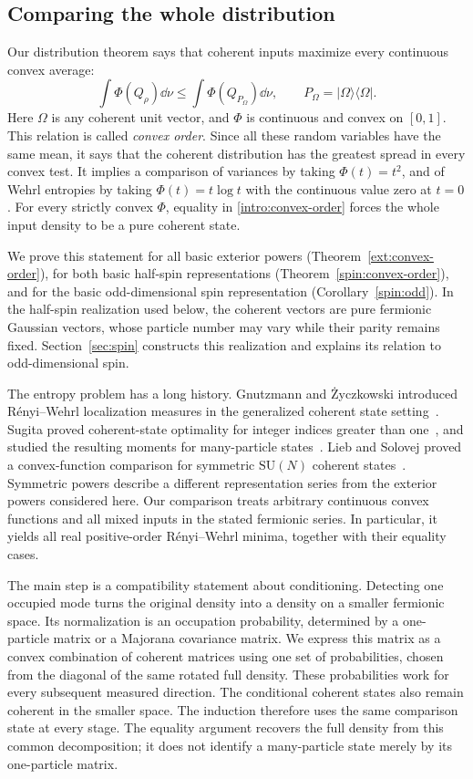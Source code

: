 \subsection{Comparing the whole distribution}
Our distribution theorem says that coherent inputs maximize every continuous
convex average:
\begin{equation}\label{intro:convex-order}
 \int \Phi(Q_\rho)\dd\nu
 \leq \int \Phi(Q_{P_\Omega})\dd\nu,
 \qquad P_\Omega=|\Omega\rangle\langle\Omega|.
\end{equation}
Here $\Omega$ is any coherent unit vector, and $\Phi$ is continuous and convex
on $[0,1]$. This relation is called \emph{convex order}. Since all these
random variables have the same mean, it says that the coherent distribution
has the greatest spread in every convex test. It implies a comparison of
variances by taking $\Phi(t)=t^2$, and of Wehrl entropies by taking
$\Phi(t)=t\log t$ with the continuous value zero at $t=0$. For every
strictly convex $\Phi$, equality in \eqref{intro:convex-order} forces the
whole input density to be a pure coherent state.

We prove this statement for all basic exterior powers
(Theorem~\ref{ext:convex-order}), for both basic half-spin representations
(Theorem~\ref{spin:convex-order}), and for the basic odd-dimensional spin
representation (Corollary~\ref{spin:odd}). In the half-spin realization
used below, the coherent vectors are pure fermionic Gaussian vectors,
whose particle number may vary while their parity remains fixed.
Section~\ref{sec:spin} constructs this realization and explains its
relation to odd-dimensional spin.

The entropy problem has a long history. Gnutzmann and \.{Z}yczkowski
introduced R\'enyi--Wehrl localization measures in the generalized coherent
state setting~\cite{gnutzmann2001}. Sugita proved coherent-state optimality
for integer indices greater than one~\cite{sugita2002}, and studied the
resulting moments for many-particle states~\cite{sugita2003}. Lieb and
Solovej proved a convex-function comparison for symmetric $\mathrm{SU}(N)$
coherent states~\cite{liebsolovej2016}. Symmetric powers describe a different
representation series from the exterior powers considered here. Our
comparison treats arbitrary continuous convex functions and all mixed
inputs in the stated fermionic series. In particular, it yields all real
positive-order R\'enyi--Wehrl minima, together with their equality cases.

The main step is a compatibility statement about conditioning. Detecting one
occupied mode turns the original density into a density on a smaller
fermionic space. Its normalization is an occupation probability, determined
by a one-particle matrix or a Majorana covariance matrix. We express this
matrix as a convex combination of coherent matrices using one set of
probabilities, chosen from the diagonal of the same rotated full density.
These probabilities work for every subsequent measured direction. The
conditional coherent states also remain coherent in the smaller space.
The induction therefore uses the same comparison state at every stage.
The equality argument recovers the full density from this common
decomposition; it does not identify a many-particle state merely by its
one-particle matrix.

